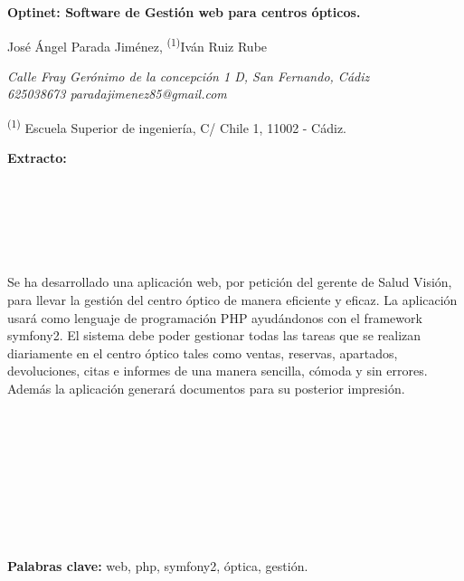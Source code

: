 \documentclass[a4paper,12pt]{article}
\newenvironment{extracto}{\begin{adjustwidth}{10mm}{10mm}}{\end{adjustwidth}}
\begin{document}
\renewcommand{\listtablename}{Índice de tablas}
\renewcommand{\tablename}{Tabla}

\begin{center}\fontsize{16}{1}\selectfont \textbf{Optinet: Software de Gestión web para centros ópticos.}\end{center}
\begin{center}\fontsize{14}{1}\selectfont José Ángel Parada Jiménez, \textsuperscript{(1)}Iván Ruiz Rube\end{center}
\begin{center}\textit{Calle Fray Gerónimo de la concepción 1 D, San Fernando, Cádiz \\625038673 paradajimenez85@gmail.com}\end{center}
\begin{center}\textsuperscript{(1)} Escuela Superior de ingeniería, C/ Chile 1, 11002 - Cádiz.\end{center}

\vspace*{2\baselineskip}
\begin{extracto}

\noindent \fontsize{10}{1}\selectfont \textbf{Extracto:}\\\\\\\\\\\\\\
Se ha desarrollado una aplicación web, por petición del gerente de Salud Visión, para llevar la gestión del centro óptico de manera eficiente y eficaz. La aplicación usará como lenguaje de programación PHP ayudándonos con el framework symfony2. El sistema debe poder gestionar todas las tareas que se realizan diariamente en el centro óptico tales como ventas, reservas, apartados, devoluciones, citas e informes de una manera sencilla, cómoda y sin errores. Además la aplicación generará documentos para su posterior impresión.\\\\\\\\\\\\\\\\\\\\ 
\textbf{Palabras clave:} web, php, symfony2, óptica, gestión.
\end{extracto}
\end{document}
